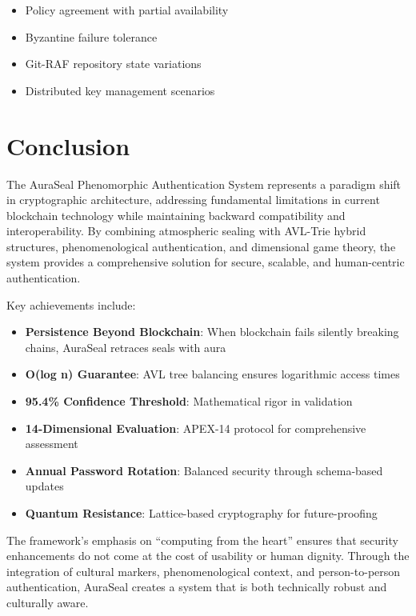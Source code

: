 \documentclass[12pt,a4paper]{report}
\theoremstyle{definition}
\begin{document}
\begin{itemize}
    \item Policy agreement with partial availability
    \item Byzantine failure tolerance
    \item Git-RAF repository state variations
    \item Distributed key management scenarios
\end{itemize}


\chapter*{Conclusion}

The AuraSeal Phenomorphic Authentication System represents a paradigm shift in cryptographic architecture, addressing fundamental limitations in current blockchain technology while maintaining backward compatibility and interoperability. By combining atmospheric sealing with AVL-Trie hybrid structures, phenomenological authentication, and dimensional game theory, the system provides a comprehensive solution for secure, scalable, and human-centric authentication.

Key achievements include:

\begin{itemize}
    \item \textbf{Persistence Beyond Blockchain}: When blockchain fails silently breaking chains, AuraSeal retraces seals with aura
    \item \textbf{O(log n) Guarantee}: AVL tree balancing ensures logarithmic access times
    \item \textbf{95.4\% Confidence Threshold}: Mathematical rigor in validation
    \item \textbf{14-Dimensional Evaluation}: APEX-14 protocol for comprehensive assessment
    \item \textbf{Annual Password Rotation}: Balanced security through schema-based updates
    \item \textbf{Quantum Resistance}: Lattice-based cryptography for future-proofing
\end{itemize}

The framework's emphasis on ``computing from the heart'' ensures that security enhancements do not come at the cost of usability or human dignity. Through the integration of cultural markers, phenomenological context, and person-to-person authentication, AuraSeal creates a system that is both technically robust and culturally aware.
\end{document}

